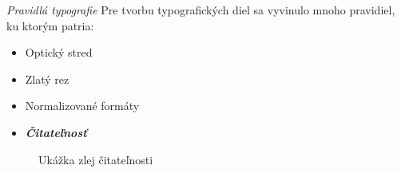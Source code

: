 \documentclass[xcolor=dvipsnames]{beamer}
\begin{document}
\begin{frame}{\emph{Pravidlá typografie}}
	Pre tvorbu typografických diel sa vyvinulo mnoho pravidiel, ku ktorým patria:
  \begin{itemize}
  \bigskip
		\item Optický stred
		\item Zlatý rez
		\item Normalizované formáty
    	\item \emph{\textbf{\color{red}Čitateľnosť}}
	\end{itemize} 
\begin{figure}
	\begin{center}
    	\caption{Ukážka zlej čitateľnosti}
    \end{center}
\end{figure}
\end{frame}

\end{document}
